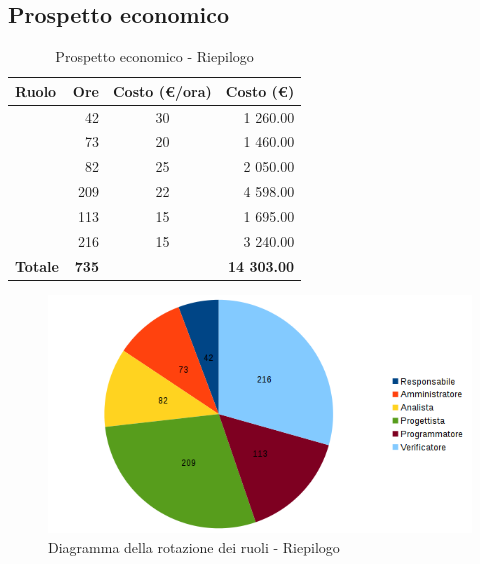 \documentclass[12pt,a4paper]{article}
\begin{document}
\subsection{Prospetto economico}

\begin{table}[H]
	\begin{center}
		\begin{tabular}{l r c r}
			\toprule
			\textbf{Ruolo}	& \textbf{Ore} & \textbf{Costo (\euro/ora)}	& \textbf{Costo (\euro)} \\ \midrule
			\midrule
			\RE & 42 & 30 & 1 260.00 \\ \midrule
			\AM & 73 & 20 & 1 460.00 \\ \midrule
			\AN & 82 & 25 & 2 050.00 \\ \midrule
			\PG & 209 & 22 & 4 598.00 \\ \midrule
			\PR & 113 & 15 & 1 695.00 \\ \midrule
			\VR & 216 & 15 & 3 240.00 \\ \midrule
			\textbf{Totale} & \textbf{735} &  & \textbf{14 303.00} \\
			\bottomrule
		\end{tabular}
		\caption{Prospetto economico - Riepilogo}
	\end{center}
\end{table}

\begin{center}
	\begin{figure}[H]
		\centering \includegraphics[width=\textwidth]{diagrammaTortaRiepilogoTotaleOre.png}
		\caption{Diagramma della rotazione dei ruoli - Riepilogo}
	\end{figure}
\end{center}

\newpage
\end{document}
